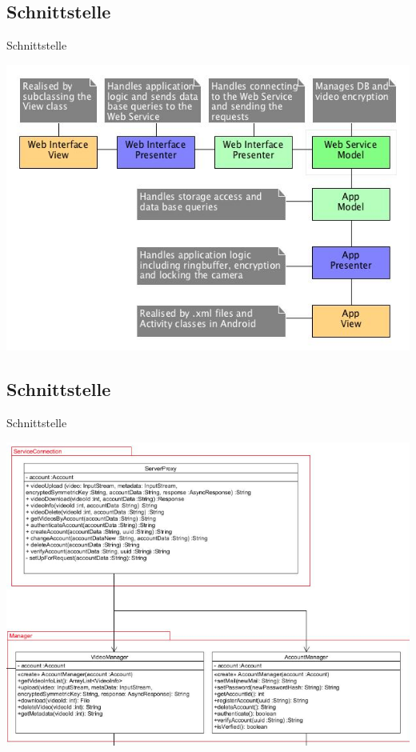 \documentclass[19pt]{beamer}
\begin{document}
\subsection{Schnittstelle}
\begin{frame}{Schnittstelle}
\begin{center}
\includegraphics[scale=0.3]{resources/overview_mvp.jpg}
\end{center}
\end{frame}
\subsection{Schnittstelle}
\begin{frame}{Schnittstelle}
\begin{center}
\includegraphics[scale=0.3]{resources/service_rest.png}
\end{center}
\end{frame}
\end{document}
